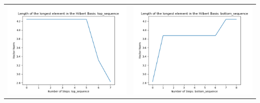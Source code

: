 \documentclass[10pt]{article}
\begin{document}
\begin{tabular}{c|c}
\begin{minipage}{.45\textwidth}
\includegraphics[width=\textwidth]{"DATA/5d/5 generators 2 bound J/top_sequence LENGTH"}
\end{minipage} &
\begin{minipage}{.45\textwidth}
\includegraphics[width=\textwidth]{"DATA/5d/5 generators 2 bound J bottomup/bottom_sequence LENGTH"}
\end{minipage}
\end{tabular}
\end{document}
